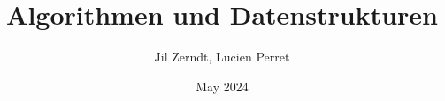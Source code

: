 \documentclass[a4paper, fontsize = 8pt, landscape]{scrartcl}
\title{Algorithmen und Datenstrukturen}
\author{Jil Zerndt, Lucien Perret}
\date{May 2024}
\begin{document}
\begin{multicols}{3}
	\thispagestyle{TitlePageStyle}
	\maketitle
	\raggedcolumns
	\pagebreak
	
\end{multicols}
\end{document}
